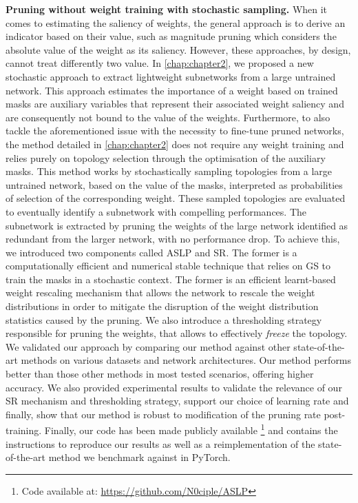 \noindent \textbf{Pruning without weight training with stochastic sampling.}
When it comes to estimating the saliency of weights, the general approach is to
derive an indicator based on their value, such as magnitude pruning which
considers the absolute value of the weight as its saliency. However, these
approaches, by design, cannot treat differently two \DIFdelbegin {}\DIFdelend \DIFaddbegin {}\DIFaddend value. In \cref{chap:chapter2}, we proposed a new stochastic approach to
extract lightweight subnetworks from a large untrained network. This approach
estimates the importance of a weight based on trained masks \DIFdelbegin {}\DIFdelend \DIFaddbegin {}\DIFaddend are auxiliary
variables that represent their associated weight saliency and are consequently
not bound to the value of the weights. Furthermore, to also tackle the
aforementioned issue with the necessity to fine-tune pruned networks, the method
detailed in \cref{chap:chapter2} does not require any weight training and relies
purely on topology selection through the optimisation of the auxiliary masks.
This method works by stochastically sampling topologies from a large untrained
network, based on the value of the masks, interpreted as probabilities of
selection of the corresponding weight. These sampled topologies are evaluated to
eventually identify a subnetwork with compelling performances. The subnetwork is
extracted by pruning the weights of the large network identified as redundant
from the larger network, with no performance drop. To achieve this, we
introduced two components called \acf{ASLP} and \acf{SR}. The former is a
computationally efficient and numerical stable technique that relies on \acl{GS}
to train the masks in a stochastic context. The former is an efficient
learnt-based weight rescaling mechanism that allows the network to rescale the
weight distributions in order to mitigate the disruption of the weight
distribution statistics caused by the pruning. We also introduce a thresholding
strategy responsible for pruning the weights, that allows to effectively
\emph{freeze} the topology.\\

We validated our approach by comparing our method against other state-of-the-art
methods on various datasets and network architectures. Our method performs
better than those other methods in most tested scenarios, offering higher
accuracy. We also provided experimental results to validate the relevance of our
\ac{SR} mechanism and thresholding strategy, support our choice of learning rate
and finally, show that our method is robust to modification of the pruning rate
post-training. Finally, our code has been made publicly available \footnote{Code
available at: \url{https://github.com/N0ciple/ASLP}} and contains the
instructions to reproduce our results as well as a reimplementation of the
state-of-the-art method we benchmark against in PyTorch.\\ 

